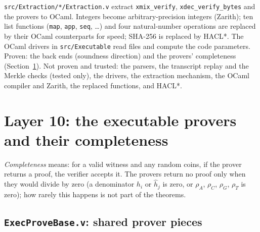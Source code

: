 \documentclass[11pt,a4paper]{article}
\newcommand{\hh}{\hat{h}}
\theoremstyle{definition}
\theoremstyle{plain}
\begin{document}
\texttt{src/Extraction/*/Extraction.v} extract \texttt{xmix\_verify}, \texttt{xdec\_verify\_bytes} and the
provers to OCaml. Integers become arbitrary-precision integers (Zarith); ten list functions
(\texttt{map}, \texttt{app}, \texttt{seq}, \dots) and four natural-number operations are replaced by their
OCaml counterparts for speed; SHA-256 is replaced by HACL*. The OCaml drivers in
\texttt{src/Executable} read files and compute the code parameters. Proven: the back ends (soundness
direction) and the provers' completeness (Section~\ref{sec:fm-prove}). Not proven and trusted: the
parsers, the transcript replay and the Merkle checks (tested only), the drivers, the extraction
mechanism, the OCaml compiler and Zarith, the replaced functions, and HACL*.

\section{Layer 10: the executable provers and their completeness}
\label{sec:fm-prove}

\emph{Completeness} means: for a valid witness and any random coins, if the prover returns a proof,
the verifier accepts it. The provers return no proof only when they would divide by zero (a
denominator $h_i$ or $\hh_j$ is zero, or $\rho_A$, $\rho_C$, $\rho_G$, $\rho_T$ is zero); how rarely
this happens is not part of the theorems.

\subsection{\texttt{ExecProveBase.v}: shared prover pieces}
\end{document}
